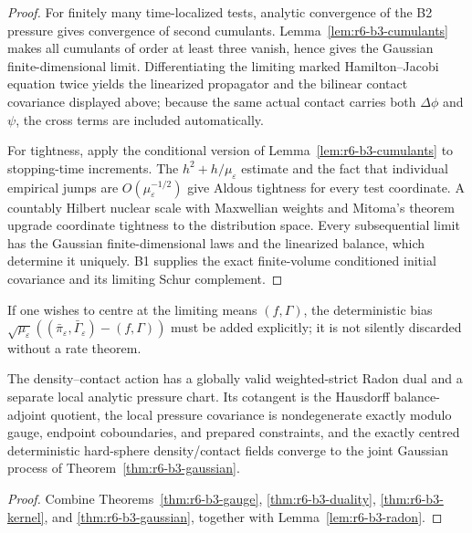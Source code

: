 \begin{proof}
For finitely many time-localized tests, analytic convergence of the B2
pressure gives convergence of second cumulants.  Lemma~\ref{lem:r6-b3-cumulants}
makes all cumulants of order at least three vanish, hence gives the Gaussian
finite-dimensional limit.  Differentiating the limiting marked
Hamilton--Jacobi equation twice yields the linearized propagator and the
bilinear contact covariance displayed above; because the same actual contact
carries both \(\Delta\phi\) and \(\psi\), the cross terms are included
automatically.

For tightness, apply the conditional version of
Lemma~\ref{lem:r6-b3-cumulants} to stopping-time increments.  The
\(h^2+h/\mu_\varepsilon\) estimate and the fact that individual empirical
jumps are \(O(\mu_\varepsilon^{-1/2})\) give Aldous tightness for every test
coordinate.  A countably Hilbert nuclear scale with Maxwellian weights and
Mitoma's theorem upgrade coordinate tightness to the distribution space.
Every subsequential limit has the Gaussian finite-dimensional laws and the
linearized balance, which determine it uniquely.  B1 supplies the exact
finite-volume conditioned initial covariance and its limiting Schur
complement.
\end{proof}

If one wishes to centre at the limiting means \((f,\Gamma)\), the deterministic
bias
\(\sqrt{\mu_\varepsilon}((\bar\pi_\varepsilon,
\bar\Gamma_\varepsilon)-(f,\Gamma))\) must be added explicitly; it is not
silently discarded without a rate theorem.

\begin{theorem}
\label{thm:r6-b3-main}
The density--contact action has a globally valid weighted-strict Radon dual and
a separate local analytic pressure chart.  Its cotangent is the Hausdorff
balance-adjoint quotient, the local pressure covariance is nondegenerate
exactly modulo gauge, endpoint coboundaries, and prepared constraints, and the
exactly centred deterministic hard-sphere density/contact fields converge to
the joint Gaussian process of Theorem~\ref{thm:r6-b3-gaussian}.
\end{theorem}

\begin{proof}
Combine Theorems~\ref{thm:r6-b3-gauge},
\ref{thm:r6-b3-duality}, \ref{thm:r6-b3-kernel}, and
\ref{thm:r6-b3-gaussian}, together with
Lemma~\ref{lem:r6-b3-radon}.
\end{proof}
